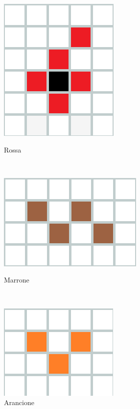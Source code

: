 \begin{figure}[h]
	
	\begin{minipage}{3.5cm}
		\centering
		\includegraphics[scale=0.30]{immagini/p}
		\caption{Rossa}
		\label{p}
	\end{minipage}
	\ \hspace{2mm} \hspace{3mm} \
	\begin{minipage}{3.5cm}
		\centering
		\includegraphics[scale=0.30]{immagini/z}
		\caption{Marrone}
		\label{z}
	\end{minipage}
	\ \hspace{2mm} \hspace{3mm} \
	\begin{minipage}{3.5cm}
		\centering
		\includegraphics[scale=0.30]{immagini/smallv}
		\caption{Arancione}
		\label{smallv}
	\end{minipage}
\end{figure}


